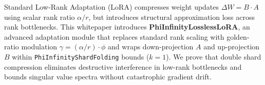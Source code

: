 \begin{abstractbox}
Standard Low-Rank Adaptation (LoRA) compresses weight updates $\Delta W = B \cdot A$ using scalar rank ratio $\alpha / r$, but introduces structural approximation loss across rank bottlenecks. This whitepaper introduces \textbf{PhiInfinityLosslessLoRA}, an advanced adaptation module that replaces standard rank scaling with golden-ratio modulation $\gamma = (\alpha / r) \cdot \phi$ and wraps down-projection $A$ and up-projection $B$ within \texttt{PhiInfinityShardFolding} bounds ($k=1$). We prove that double shard compression eliminates destructive interference in low-rank bottlenecks and bounds singular value spectra without catastrophic gradient drift.
\end{abstractbox}